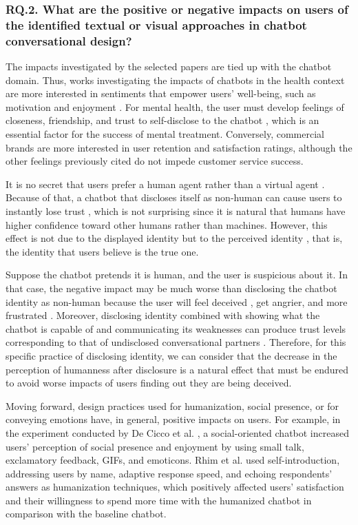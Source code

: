\subsubsection{RQ.2. What are the positive or negative impacts on users of the identified textual or visual approaches in chatbot conversational design?}\label{sec:rq2}

The impacts investigated by the selected papers are tied up with the chatbot domain. Thus, works investigating the impacts of chatbots in the health context are more interested in sentiments that empower users' well-being, such as motivation and enjoyment . For mental health, the user must develop feelings of closeness, friendship, and trust to self-disclose to the chatbot , which is an essential factor for the success of mental treatment. Conversely, commercial brands are more interested in user retention and satisfaction ratings, although the other feelings previously cited do not impede customer service success. 

It is no secret that users prefer a human agent rather than a virtual agent \cite{Lei20213977}. Because of that, a chatbot that discloses itself as non-human can cause users to instantly lose trust , which is not surprising since it is natural that humans have higher confidence toward other humans rather than machines. However, this effect is not due to the displayed identity but to the perceived identity , that is, the identity that users believe is the true one. 

Suppose the chatbot pretends it is human, and the user is suspicious about it. In that case, the negative impact may be much worse than disclosing the chatbot identity as non-human because the user will feel deceived , get angrier, and more frustrated \cite{GRIMES2021113515}. Moreover, disclosing identity combined with showing what the chatbot is capable of and communicating its weaknesses can produce trust levels corresponding to that of undisclosed conversational partners . Therefore, for this specific practice of disclosing identity, we can consider that the decrease in the perception of humanness after disclosure  is a natural effect that must be endured to avoid worse impacts of users finding out they are being deceived.  

Moving forward, design practices used for humanization, social presence, or for conveying emotions have, in general, positive impacts on users. For example, in the experiment conducted by De Cicco et al. , a social-oriented chatbot increased users' perception of social presence and enjoyment by using small talk, exclamatory feedback, GIFs, and emoticons. Rhim et al.  used self-introduction, addressing users by name, adaptive response speed, and echoing respondents' answers as humanization techniques, which positively affected users' satisfaction and their willingness to spend more time with the humanized chatbot in comparison with the baseline chatbot. 

